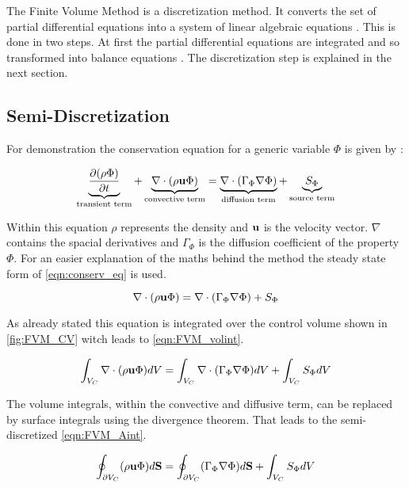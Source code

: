 \documentclass[../thesis.tex]{subfiles}
\begin{document}
The Finite Volume Method is a discretization method. It converts the set of partial differential equations into a system of linear algebraic equations \cite{darwish2021finite}. This is done in two steps. At first the partial differential equations are integrated and so transformed into balance equations \cite{darwish2021finite}. The discretization step is explained in the next section.

\subsection{Semi-Discretization}

For demonstration the conservation equation for a generic variable $ \Phi $ is given by \cite{darwish2021finite}:

\begin{equation}
	\label{eqn:conserv_eq}
	\underbrace{\dfrac{\partial(\rho \Phi)}{\partial t}}_{\text{transient term}} + \underbrace{\nabla \cdot (\rho \bold{u} \Phi)}_{\text{convective term}} = \underbrace{\nabla \cdot (\Gamma_\Phi \nabla \Phi)}_{\text{diffusion term}} + \underbrace{S_\Phi}_{\text{source term}}
\end{equation}

Within this equation $ \rho $ represents the density and $ \bold{u} $ is the velocity vector. $ \nabla $ contains the spacial derivatives and $ \Gamma_\Phi $ is the diffusion coefficient of the property $ \Phi $.
For an easier explanation of the maths behind the method the steady state form of \autoref{eqn:conserv_eq} is used.

\begin{equation}
	\nabla \cdot (\rho \bold{u} \Phi) = \nabla \cdot (\Gamma_\Phi \nabla \Phi) + S_\Phi
\end{equation}

As already stated this equation is integrated over the control volume shown in \autoref{fig:FVM_CV} witch leads to \autoref{eqn:FVM_volint}.

\begin{equation}
	\label{eqn:FVM_volint}
	\int_{V_C} \nabla \cdot (\rho \bold{u} \Phi) dV = \int_{V_C} \nabla \cdot (\Gamma_\Phi \nabla \Phi) dV + \int_{V_C} S_\Phi dV
\end{equation}

The volume integrals, within the convective and diffusive term, can be replaced by surface integrals using the divergence theorem. That leads to the semi-discretized \autoref{eqn:FVM_Aint}.

\begin{equation}
	\label{eqn:FVM_Aint}
	\oint_{\partial V_C} (\rho \bold{u} \Phi) d\bold{S} = \oint_{\partial V_C} (\Gamma_\Phi \nabla \Phi) d\bold{S} + \int_{V_C} S_\Phi dV
\end{equation}
\end{document}
